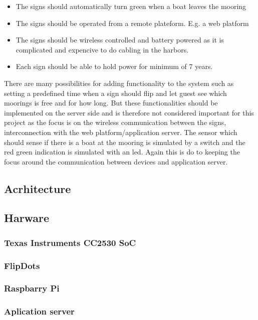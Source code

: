 \documentclass[a4paper,12pt,english]{article}
\begin{document}
\begin{itemize}
	\item The signs should automatically turn green when a boat leaves the mooring
	\item The signs should be operated from a remote plateform. E.g. a web platform
	\item The signs should be wireless controlled and battery powered as it is
	      complicated and expencive to do cabling in the harbors.
	\item Each sign should be able to hold power for minimum of 7 years.
\end{itemize}

There are
many possibilities for adding functionality to the system such as setting a
predefined time when a sign should flip and let guest see which moorings is
free and for how long. But these functionalities should be implemented on the
server side and is therefore not considered important for this project as the
focus is on the wireless communication between the signs, interconnection with the web
platform/application server. The sensor which should sense if there is a boat
at the mooring is simulated by a switch and the red green indication is
simulated with an led. Again this is do to keeping the focus around the
communication between devices and application server.

\subsection{Acrhitecture}

\subsection{Harware}
\subsubsection{Texas Instruments CC2530 SoC}
\subsubsection{FlipDots}
\subsubsection{Raspbarry Pi}
\subsubsection{Aplication server}
\end{document}
